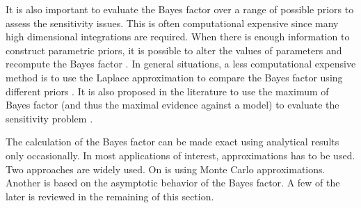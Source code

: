 It is also important to evaluate the Bayes factor over a range of possible
priors to assess the sensitivity issues. This is often computational expensive
since many high dimensional integrations are required. When there is enough
information to construct parametric priors, it is possible to alter the values
of parameters and recompute the Bayes factor \cite{McCulloch:1991hj}. In
general situations, a less computational expensive method is to use the
Laplace approximation to compare the Bayes factor using different priors
\cite{Kass:1992tz}. It is also proposed in the literature to use the maximum
of Bayes factor (and thus the maximal evidence against a model) to evaluate
the sensitivity problem \cite{Berger:1987iq}.

The calculation of the Bayes factor can be made exact using analytical results
only occasionally. In most applications of interest, approximations has to be
used. Two approaches are widely used. On is using Monte Carlo approximations.
Another is based on the asymptotic behavior of the Bayes factor. A few of the
later is reviewed in the remaining of this section.
